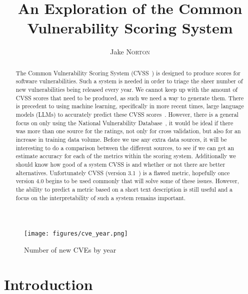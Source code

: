 \documentclass[12pt]{article}
\title{An Exploration of the Common Vulnerability Scoring System}
\author{Jake \textsc{Norton}}
\begin{document}
\maketitle

\begin{abstract}

	The Common Vulnerability Scoring System (CVSS~\cite{CVSS}) is designed to produce scores for
	software vulnerabilities. Such a system is needed in order to triage the sheer number of new
	vulnerabilities being released every year. We cannot keep up with the amount of CVSS scores that
	need to be produced, as such we need a way to generate them. There is precedent to using machine
	learning, specifically in more recent times, large language models (LLMs) to accurately predict
	these CVSS scores~\cite{costa}. However, there is a general focus on only using the National
	Vulnerability Database~\cite{costa,nvd_example1,nvd_example2}, it would be ideal if
	there was more than one source for the ratings, not only for cross validation, but also for an
	increase in training data volume. Before we use any extra data sources, it will be interesting to do a
	comparison between the different sources, to see if we can get an estimate accuracy for each of
	the metrics within the scoring system. Additionally we should know how good of a system CVSS is
	and whether or not there are better alternatives. Unfortunately CVSS (version 3.1~\cite{CVSS_31}) is a flawed
	metric, hopefully once version 4.0 begins to be used commonly that will solve some of these issues.
	However, the ability to predict a metric based on a short text description is still useful and a
	focus on the interpretability of such a system remains important.

\end{abstract}

\begin{figure}
	\centering
	\texttt{[image: figures/cve\_year.png]}
	\caption{\label{fig:cve_year}Number of new CVEs by year}
\end{figure}

\section{Introduction}
\end{document}
